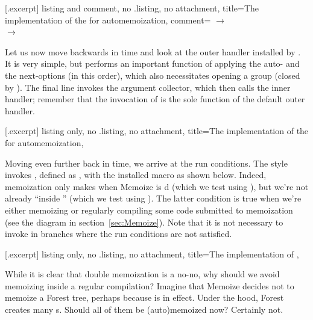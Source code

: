 \documentclass[a4paper,11pt]{article}
\begin{document}
[.excerpt]{%
  listing and comment, no .listing, no attachment,
  title={The implementation of the 
    for automemoization},
  comment={%
    $\rightarrow$ %
    \\
    $\rightarrow$ %
  }
}

Let us now move backwards in time and look at the outer handler installed by
.  It is very simple, but performs an important function of
applying the auto- and the next-options (in this order), which also
necessitates opening a group (closed by ).  The final line
invokes the argument collector, which then calls the inner handler; remember
that the invocation of  is the sole function of the
default outer handler.

[.excerpt]{%
  listing only, no .listing, no attachment,
  title={The implementation of the 
    for automemoization},
}

Moving even further back in time, we arrive at the run conditions.  The
 style invokes ,
defined as , with
the installed macro as shown below.  Indeed, memoization only makes when
Memoize is d (which we test using ), but we're
not already ``inside '' (which we test using
).  The latter condition is true when we're either
memoizing or regularly compiling some code submitted to memoization (see the
diagram in section~\ref{sec:Memoize}).  Note that it is not necessary to invoke
 in branches where the run conditions are not satisfied.

[.excerpt]{%
  listing only, no .listing, no attachment,
  title={The implementation of 
    },
}

While it is clear that double memoization is a no-no, why should we avoid
memoizing inside a regular compilation?  Imagine that Memoize decides not to
memoize a Forest tree, perhaps because  is in effect.  Under
the hood, Forest creates many s.  Should all of them be
(auto)memoized now? Certainly not.
\end{document}
